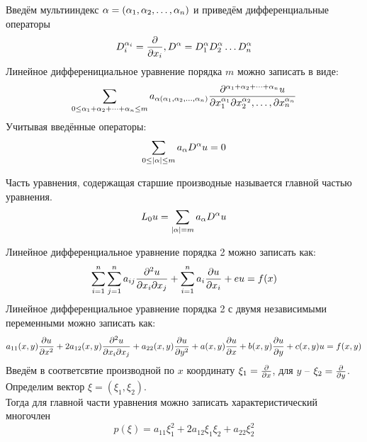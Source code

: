 \documentclass[../main.tex]{subfiles}
\begin{document}
Введём мультииндекс $\alpha = (\alpha_1,\alpha_2,\dots,\alpha_n)$ и приведём дифференциальные операторы
\[D^{\alpha_i}_i=\frac{\partial  }{\partial x_i}, D^\alpha = D^\alpha_1 D^\alpha_2\dots D^\alpha_n\]
Линейное дифференициальное уравнение порядка $m$ можно записать в виде:
\[
	\sum_{0 \leq \alpha_1+\alpha_2+\dots+\alpha_n \leq m}
	a_{\alpha(\alpha_1, \alpha_2, \dots, \alpha_n)}
	\frac{\partial ^{\alpha_1+\alpha_2+\dots+\alpha_n}u}{\partial x_1^{\alpha_1} \partial{x_2^{\alpha_2}}, \dots, \partial{x_n^{\alpha_n}}}
\]
Учитывая введённые операторы:
\[
	\sum_{0 \leq |\alpha| \leq m}a_\alpha D^\alpha u = 0
\]

\begin{definition}
	Часть уравнения, содержащая старшие производные называется
	главной частью уравнения.
	\[L_0u = \sum_{|\alpha|=m} a_\alpha D^\alpha u\]
\end{definition}
Линейное дифференциальное уравнение порядка 2 можно записать как:
\[
	\sum^n_{i=1}\sum^n_{j=1}a_{ij}\frac{\partial ^2u}{\partial x_i \partial{x_j}} + 
	\sum^n_{i=1}a_i\frac{\partial u}{\partial x_i} + eu = f(x)
\]
Линейное дифференциальное уравнение порядка 2 с двумя 
независимыми переменными можно записать как:
\begin{equation}
	\label{eq:1.1} %
	a_{11}(x,y)\pderiv{u}{x^2} + 2a_{12}(x,y)\pderiv{^2u}{x_i \partial{x_j}} +
	a_{22}(x,y)\pderiv{u}{y^2} + a(x,y)\pderiv{u}{x} + b(x,y)\pderiv{u}{y} + c(x,y)u = f(x,y)
\end{equation}
Введём в соответсвтие производной по $x$ координату $\xi_1=\frac{\partial  }{\partial x}$,
для $y$ -- $\xi_2 = \frac{\partial  }{\partial y}$. Определим вектор $\xi=(\xi_1, \xi_2)$.\\
Тогда для главной части уравнения можно записать характеристический многочлен
\[
	p(\xi)=a_{11}\xi_1^2 + 2a_{12}\xi_1\xi_2 + a_{22}\xi_2^2
\]
\end{document}
